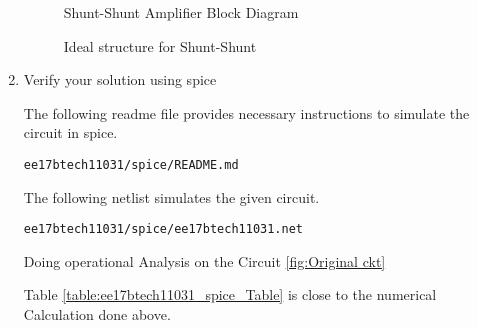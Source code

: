 \begin{enumerate}[label=\thesection.\arabic*.,ref=\thesection.\theenumi]
\begin{table}[!ht]
\centering

\caption{}
\label{table:ee17btech11031_value_Table}
\end{table}

 \begin{figure}[!ht]
 	\begin{center}
 			\resizebox{\columnwidth}{!}{}
 	\end{center}
 \caption{Shunt-Shunt Amplifier Block Diagram}
 \label{fig: ss2 ckt}
 \end{figure}

 \begin{figure}[!ht]
 	\begin{center}
 			\resizebox{\columnwidth}{!}{}
 	\end{center}
 \caption{Ideal structure for Shunt-Shunt}
 \label{fig:ideal ckt}
 \end{figure}
 
\item Verify your solution using spice

\solution 
The following readme file provides necessary instructions to simulate the circuit in spice.
\begin{lstlisting}
ee17btech11031/spice/README.md
\end{lstlisting}
The following netlist simulates the given circuit.
\begin{lstlisting}
ee17btech11031/spice/ee17btech11031.net
\end{lstlisting}

Doing operational Analysis on the Circuit \ref{fig:Original ckt}

\begin{table}[!ht]
\centering

\caption{}
\label{table:ee17btech11031_spice_Table}
\end{table}

Table \ref{table:ee17btech11031_spice_Table} is close to the numerical Calculation done above.
 \end{enumerate}

